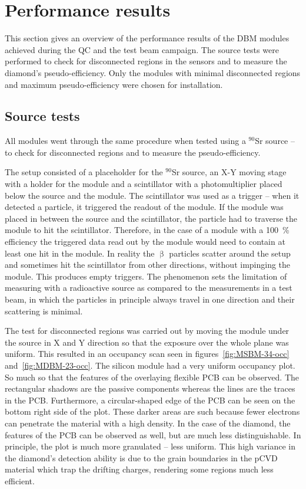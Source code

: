 \documentclass[twoside,12pt]{packages/mytustyle}  %
\begin{document}
\section{Performance results}
\label{sec:perfresults}
This section gives an overview of the performance results of the DBM modules achieved during the QC and the test beam campaign. The source tests were performed to check for disconnected regions in the sensors and to measure the diamond's pseudo-efficiency. Only the modules with minimal disconnected regions and maximum pseudo-efficiency were chosen for installation. 

\subsection{Source tests}
All modules went through the same procedure when tested using a $^{90}$Sr source -- to check for disconnected regions and to measure the pseudo-efficiency. 

The setup consisted of a placeholder for the $^{90}$Sr source, an X-Y moving stage with a holder for the module and a scintillator with a photomultiplier placed below the source and the module. The scintillator was used as a trigger -- when it detected a particle, it triggered the readout of the module. If the module was placed in between the source and the scintillator, the particle had to traverse the module to hit the scintillator. Therefore, in the case of a module with a 100~\% efficiency the triggered data read out by the module would need to contain at least one hit in the module. In reality the $\upbeta$ particles scatter around the setup and sometimes hit the scintillator from other directions, without impinging the module. This produces empty triggers. The phenomenon sets the limitation of measuring with a radioactive source as compared to the measurements in a test beam, in which the particles in principle always travel in one direction and their scattering is minimal. 

The test for disconnected regions was carried out by moving the module under the source in X and Y direction so that the exposure over the whole plane was uniform. This resulted in an occupancy scan seen in figures~\ref{fig:MSBM-34-occ} and~\ref{fig:MDBM-23-occ}. The silicon module had a very uniform occupancy plot. So much so that the features of the overlaying flexible PCB can be observed. The rectangular shadows are the passive components whereas the lines are the traces in the PCB. Furthermore, a circular-shaped edge of the PCB can be seen on the bottom right side of the plot. These darker areas are such because fewer electrons can penetrate the material with a high density. In the case of the diamond, the features of the PCB can be observed as well, but are much less distinguishable. In principle, the plot is much more granulated -- less uniform. This high variance in the diamond's detection ability is due to the grain boundaries in the pCVD material which trap the drifting charges, rendering some regions much less efficient. 
\end{document}
